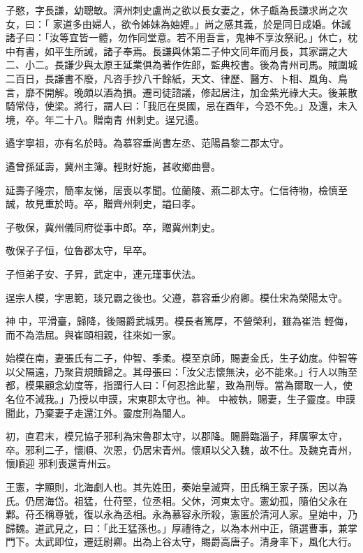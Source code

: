 \begin{pinyinscope}
 子愍，字長謙，幼聰敏。濟州刺史盧尚之欲以長女妻之，休子甗為長謙求尚之次女，曰：「
 家道多由婦人，欲令姊妹為妯娌。」尚之感其義，於是同日成婚。休誡諸子曰：「汝等宜皆一體，勿作同堂意。若不用吾言，鬼神不享汝祭祀。」休亡，枕中有書，如平生所誡，諸子奉焉。長謙與休第二子仲文同年而月長，其家謂之大二、小二。長謙少與太原王延業俱為著作佐郎，監典校書。後為青州司馬。賊圍城二百日，長謙書不廢，凡咨手抄八千餘紙，天文、律歷、醫方、卜相、風角、鳥言，靡不開解。晚頗以酒為損。遷司徒諮議，修起居注，加金紫光祿大夫。後兼散騎常侍，使梁。將行，謂人曰：「我厄在吳國，忌在酉年，今恐不免。」及還，未入境，卒。年二十八。贈南青
 州刺史。逞兄遹。



 遹字寧祖，亦有名於時。為慕容垂尚書左丞、范陽昌黎二郡太守。



 遹曾孫延壽，冀州主簿。輕財好施，甚收鄉曲譽。



 延壽子隆宗，簡率友悌，居喪以孝聞。位蘭陵、燕二郡太守。仁信待物，檢慎至誠，故見重於時。卒，贈齊州刺史，謚曰孝。



 子敬保，冀州儀同府從事中郎。卒，贈冀州刺史。



 敬保子子恒，位魯郡太守，早卒。



 子恒弟子安、子昇，武定中，連元瑾事伏法。



 逞宗人模，字思範，琰兄霸之後也。父遵，慕容垂少府卿。模仕宋為榮陽太守。



 神中，平滑臺，歸降，後賜爵武城男。模長者篤厚，不營榮利，雖為崔浩
 輕侮，而不為浩屈。與崔頤相親，往來如一家。



 始模在南，妻張氏有二子，仲智、季柔。模至京師，賜妻金氏，生子幼度。仲智等以父隔遠，乃聚貨規贖歸之。其母張曰：「汝父志懷無決，必不能來。」行人以賄至都，模果顧念幼度等，指謂行人曰：「何忍捨此輩，致為刑辱。當為爾取一人，使名位不減我。」乃授以申謨，宋東郡太守也。神。中被執，賜妻，生子靈度。申謨聞此，乃棄妻子走還江外。靈度刑為閽人。



 初，直君末，模兄協子邪利為宋魯郡太守，以郡降。賜爵臨淄子，拜廣寧太守，卒。邪利二子，懷順、次恩，仍居宋青州。懷順以父入魏，故不仕。及魏克青州，懷順迎
 邪利喪還青州云。



 王憲，字顯則，北海劇人也。其先姓田，秦始皇滅齊，田氏稱王家子孫，因以為氏。仍居海岱。祖猛，仕苻堅，位丞相。父休，河東太守。憲幼孤，隨伯父永在鄴。苻丕稱尊號，復以永為丞相。永為慕容永所殺，憲匿於清河人家。皇始中，乃歸魏。道武見之，曰：「此王猛孫也。」厚禮待之，以為本州中正，領選曹事，兼掌門下。太武即位，遷廷尉卿。出為上谷太守，賜爵高唐子。清身率下，風化大行。




\end{pinyinscope}
